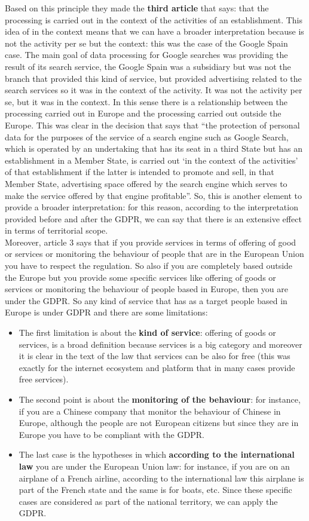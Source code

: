 Based on this principle they made the \textbf{third article} that says: that the processing is carried out in the context of the activities of an establishment. This idea of in the context means that we can have a broader interpretation because is not the activity per se but the context: this was the case of the Google Spain case. The main goal of data processing for Google searches was providing the result of its search service, the Google Spain was a subsidiary but was not the branch that provided this kind of service, but provided advertising related to the search services so it was in the context of the activity. It was not the activity per se, but it was in the context. In this sense there is a relationship between the processing carried out in Europe and the processing carried out outside the Europe. This was clear in the decision that says that “the protection of personal data for the purposes of the service of a search engine such as Google Search, which is operated by an undertaking that has its seat in a third State but has an establishment in a Member State, is carried out ‘in the context of the activities’ of that establishment if the latter is intended to promote and sell, in that Member State, advertising space offered by the search engine which serves to make the service offered by that engine profitable”. So, this is another element to provide a broader interpretation: for this reason, according to the interpretation provided before and after the GDPR, we can say that there is an extensive effect in terms of territorial scope.\\
Moreover, article 3 says that if you provide services in terms of offering of good or services or monitoring the behaviour of people that are in the European Union you have to respect the regulation. So also  if you are completely based outside the Europe but you provide some specific services like offering of goods or services or monitoring the behaviour of people based in Europe, then you are under the GDPR. So any kind of service that has as a target people based in Europe is under GDPR and there are some limitations:
\begin{itemize}
    \item The first limitation is about the \textbf{kind of service}: offering of goods or services, is a broad definition because services is a big category and moreover it is clear in the text of the law that services can be also for free (this was exactly for the internet ecosystem and platform that in many cases provide free services).
    \item The second point is about the \textbf{monitoring of the behaviour}: for instance, if you are a Chinese company that monitor the behaviour of Chinese in Europe, although the people are not European citizens but since they are in Europe you have to be compliant with the GDPR.
    \item The last case is the hypotheses in which \textbf{according to the international law} you are under the European Union law: for instance, if you are on an airplane of a French airline, according to the international law this airplane is part of the French state and the same is for boats, etc. Since these specific cases are considered as part of the national territory, we can apply the GDPR.
\end{itemize}
